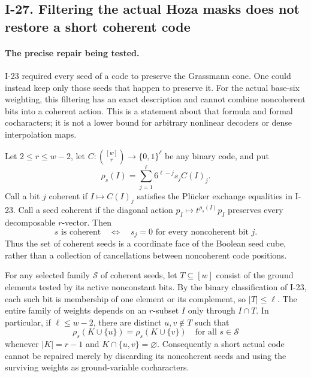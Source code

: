 \subsection{I-27. Filtering the actual Hoza masks does not restore a short coherent code}
\label{I-27}

\paragraph{The precise repair being tested.}
I-23 required every seed of a code to preserve the Grassmann cone.
One could instead keep only those seeds that happen to preserve it.
For the actual base-six weighting, this filtering has an exact
description and cannot combine noncoherent bits into a coherent
action.  This is a statement about that formula and formal
cocharacters; it is not a lower bound for arbitrary nonlinear
decoders or dense interpolation maps.

Let $2\le r\le w-2$, let
$C:\binom{[w]}r\longrightarrow\{0,1\}^{\ell}$ be any binary
code, and put
\[
 \rho_s(I)=\sum_{j=1}^{\ell}6^{\ell-j}s_j C(I)_j.
 \tag{I.36}
\]
Call a bit $j$ coherent if $I\mapsto C(I)_j$ satisfies the
Pl\"ucker exchange equalities in I-23.  Call a seed coherent
if the diagonal action $p_I\mapsto t^{\rho_s(I)}p_I$
preserves every decomposable $r$-vector.
Then
\[
 s\text{ is coherent}
 \quad\Longleftrightarrow\quad
 s_j=0\text{ for every noncoherent bit }j.
 \tag{I.37}
\]
Thus the set of coherent seeds is a coordinate face of the
Boolean seed cube, rather than a collection of cancellations
between noncoherent code positions.

For any selected family $\mathcal S$ of coherent seeds, let
$T\subseteq[w]$ consist of the ground elements tested by its
active nonconstant bits.  By the binary classification of I-23,
each such bit is membership of one element or its complement,
so $|T|\le\ell$.  The entire family of weights depends on an
$r$-subset $I$ only through $I\cap T$.  In particular, if
$\ell\le w-2$, there are distinct $u,v\notin T$ such that
\[
 \rho_s(K\cup\{u\})=\rho_s(K\cup\{v\})
 \quad\text{for all }s\in\mathcal S
 \tag{I.38}
\]
whenever $|K|=r-1$ and $K\cap\{u,v\}=\varnothing$.
Consequently a short actual code cannot be repaired merely
by discarding its noncoherent seeds and using the surviving
weights as ground-variable cocharacters.

